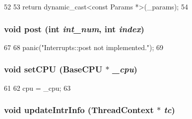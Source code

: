 \begin{DoxyCode}
52     {
53         return dynamic_cast<const Params *>(_params);
54     }
\end{DoxyCode}
\hypertarget{classPowerISA_1_1Interrupts_a24c6c4fbdc0605bcd015ce06f194e4b4}{
\subsubsection[{post}]{\setlength{\rightskip}{0pt plus 5cm}void post (int {\em int\_\-num}, \/  int {\em index})}}
\label{classPowerISA_1_1Interrupts_a24c6c4fbdc0605bcd015ce06f194e4b4}



\begin{DoxyCode}
67     {
68         panic("Interrupts::post not implemented.\n");
69     }
\end{DoxyCode}
\hypertarget{classPowerISA_1_1Interrupts_a2ab8c6aed9969bc58d6aa2427d442cc4}{
\subsubsection[{setCPU}]{\setlength{\rightskip}{0pt plus 5cm}void setCPU ({\bf BaseCPU} $\ast$ {\em \_\-cpu})}}
\label{classPowerISA_1_1Interrupts_a2ab8c6aed9969bc58d6aa2427d442cc4}



\begin{DoxyCode}
61     {
62         cpu = _cpu;
63     }
\end{DoxyCode}
\hypertarget{classPowerISA_1_1Interrupts_a00892e9b06edcba6c3c27454d6235100}{
\subsubsection[{updateIntrInfo}]{\setlength{\rightskip}{0pt plus 5cm}void updateIntrInfo ({\bf ThreadContext} $\ast$ {\em tc})}}
\label{classPowerISA_1_1Interrupts_a00892e9b06edcba6c3c27454d6235100}



